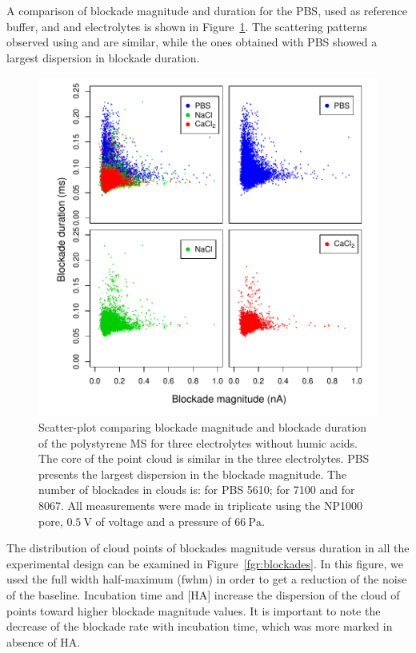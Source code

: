 \documentclass[journal=langd5,manuscript=article]{achemso}
\begin{document}
A comparison of blockade magnitude and duration for the PBS, used as reference  buffer, and  and  electrolytes is shown in Figure~\ref{fgr:pairs_buffers}.
The scattering patterns observed using    and  are similar, while the ones obtained with PBS showed a largest dispersion in blockade duration.
 \begin{figure}
  \includegraphics[width=\linewidth]{Figures/Raw_Pairs_buffers_MS_T0_Fwhm.pdf}
  \caption{Scatter-plot comparing  blockade magnitude and
  blockade duration of  the polystyrene MS for three
  electrolytes without humic acids. The core of the point cloud is similar in the three electrolytes. PBS  presents the largest dispersion in the blockade magnitude. The number of blockades in clouds is: for PBS 5610; for  7100 and for  8067. All measurements were made in triplicate using the NP1000 pore, $0.5~\mathrm{V}$ of voltage and a pressure of $66~\mathrm{Pa}$.} 
  \label{fgr:pairs_buffers}
\end{figure}






The  distribution of cloud points of blockades magnitude versus duration in all the experimental design can be examined in Figure~\ref{fgr:blockades}. In this figure, we used the full width half-maximum (fwhm) in order to get a reduction of the noise of the baseline. Incubation time and [HA]  increase the dispersion of the cloud of points toward higher blockade magnitude values. It is important to note the decrease of the blockade rate with incubation time, which was more marked in absence of HA.
\end{document}
